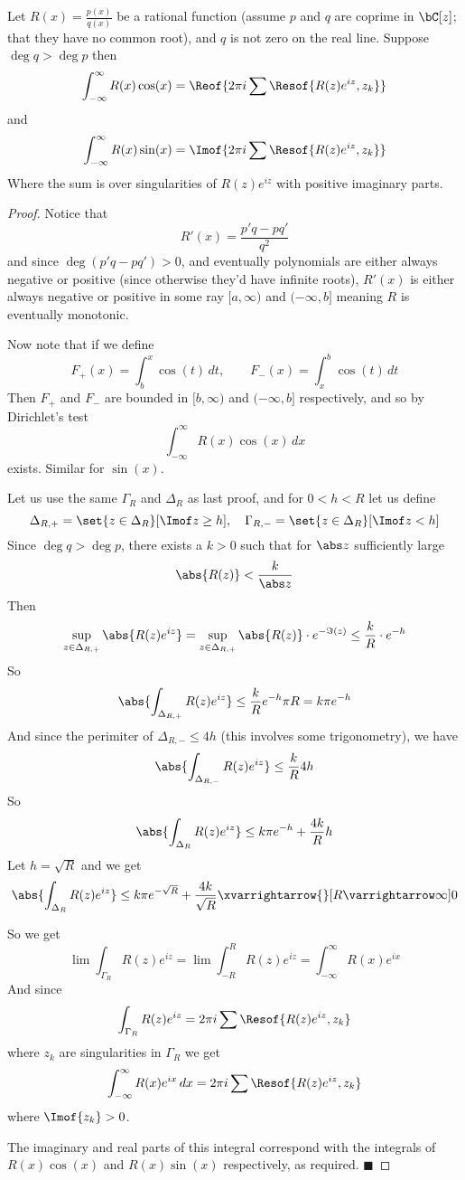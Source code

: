 \documentclass[10pt]{article}
\let\to=\varrightarrow
\def\qed{%
    \ifmmode%
        \eqno\blacksquare%
    \else%
        \hskip1cm\allowbreak\hbox{}\nobreak\hfill$\blacksquare$%
    \fi%
}
\begin{document}
\begin{prop*}

    Let $R(x)=\frac{p(x)}{q(x)}$ be a rational function (assume $p$ and $q$ are coprime in $\bC[z]$; that they have no common root), and $q$ is not zero on the real line.
    Suppose $\deg q>\deg p$ then
    \[ \int_{-\infty}^\infty R(x)\cos(x) = \Reof{2\pi i\sum \Resof{R(z)e^{iz}, z_k}} \]
    and
    \[ \int_{-\infty}^\infty R(x)\sin(x) = \Imof{2\pi i\sum \Resof{R(z)e^{iz}, z_k}} \]
    Where the sum is over singularities of $R(z)e^{iz}$ with positive imaginary parts.

\end{prop*}

\begin{proof}

    Notice that
    \[ R'(x) = \frac{p'q - pq'}{q^2} \]
    and since $\deg(p'q-pq')>0$, and eventually polynomials are either always negative or positive (since otherwise they'd have infinite roots), $R'(x)$ is either always negative or positive in some
    ray $[a,\infty)$ and $(-\infty,b]$ meaning $R$ is eventually monotonic.

    Now note that if we define
    \[ F_+(x) = \int_b^x \cos(t)\,dt,\qquad F_-(x) = \int_x^b \cos(t)\,dt \]
    Then $F_+$ and $F_-$ are bounded in $[b,\infty)$ and $(-\infty,b]$ respectively, and so by Dirichlet's test
    \[ \int_{-\infty}^\infty R(x)\cos(x)\,dx \]
    exists.
    Similar for $\sin(x)$.

    Let us use the same $\Gamma_R$ and $\Delta_R$ as last proof, and for $0<h<R$ let us define
    \[ \Delta_{R,+} = \set{z\in\Delta_R}[\Imof z\geq h],\quad \Gamma_{R,-} = \set{z\in\Delta_R}[\Imof z<h] \]
    Since $\deg q>\deg p$, there exists a $k>0$ such that for $\abs z$ sufficiently large
    \[ \abs{R(z)} < \frac k{\abs z} \]
    Then
    \[ \sup_{z\in\Delta_{R,+}}\abs{R(z)e^{iz}} = \sup_{z\in\Delta_{R,+}} \abs{R(z)}\cdot e^{-\Im(z)} \leq \frac kR\cdot e^{-h} \]
    So
    \[ \abs{\int_{\Delta_{R,+}}R(z)e^{iz}} \leq \frac kRe^{-h}\pi R = k\pi e^{-h} \]
    And since the perimiter of $\Delta_{R,-}\leq4h$ (this involves some trigonometry), we have
    \[ \abs{\int_{\Delta_{R,-}}R(z)e^{iz}} \leq \frac kR4h \]
    So
    \[ \abs{\int_{\Delta_R}R(z)e^{iz}} \leq k\pi e^{-h} + \frac{4k}Rh \]
    Let $h=\sqrt R$ and we get
    \[ \abs{\int_{\Delta_R}R(z)e^{iz}} \leq k\pi e^{-\sqrt{R}} + \frac{4k}{\sqrt R}\xvarrightarrow{}[R\to\infty] 0 \]

    So we get
    \[ \lim\int_{\Gamma_R}R(z)e^{iz} = \lim\int_{-R}^R R(z)e^{iz} = \int_{-\infty}^\infty R(x)e^{ix} \]
    And since
    \[ \int_{\Gamma_R}R(z)e^{iz} = 2\pi i\sum\Resof{R(z)e^{iz},z_k} \]
    where $z_k$ are singularities in $\Gamma_R$ we get
    \[ \int_{-\infty}^\infty R(x)e^{ix}\,dx = 2\pi i\sum\Resof{R(z)e^{iz},z_k} \]
    where $\Imof{z_k}>0$.

    The imaginary and real parts of this integral correspond with the integrals of $R(x)\cos(x)$ and $R(x)\sin(x)$ respectively, as required.
    \qed

\end{proof}
\end{document}
